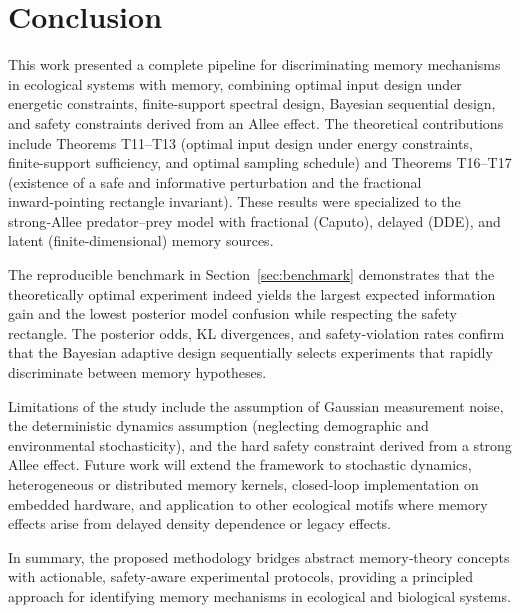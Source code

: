 \section{Conclusion}
\label{sec:conclusion}

This work presented a complete pipeline for discriminating memory mechanisms in ecological systems with memory, combining optimal input design under energetic constraints, finite-support spectral design, Bayesian sequential design, and safety constraints derived from an Allee effect.  The theoretical contributions include Theorems T11–T13 (optimal input design under energy constraints, finite-support sufficiency, and optimal sampling schedule) and Theorems T16–T17 (existence of a safe and informative perturbation and the fractional inward‑pointing rectangle invariant).  These results were specialized to the strong‑Allee predator–prey model with fractional (Caputo), delayed (DDE), and latent (finite‑dimensional) memory sources.

The reproducible benchmark in Section~\ref{sec:benchmark} demonstrates that the theoretically optimal experiment indeed yields the largest expected information gain and the lowest posterior model confusion while respecting the safety rectangle.  The posterior odds, KL divergences, and safety‑violation rates confirm that the Bayesian adaptive design sequentially selects experiments that rapidly discriminate between memory hypotheses.

Limitations of the study include the assumption of Gaussian measurement noise, the deterministic dynamics assumption (neglecting demographic and environmental stochasticity), and the hard safety constraint derived from a strong Allee effect.  Future work will extend the framework to stochastic dynamics, heterogeneous or distributed memory kernels, closed‑loop implementation on embedded hardware, and application to other ecological motifs where memory effects arise from delayed density dependence or legacy effects.

In summary, the proposed methodology bridges abstract memory‑theory concepts with actionable, safety‑aware experimental protocols, providing a principled approach for identifying memory mechanisms in ecological and biological systems.